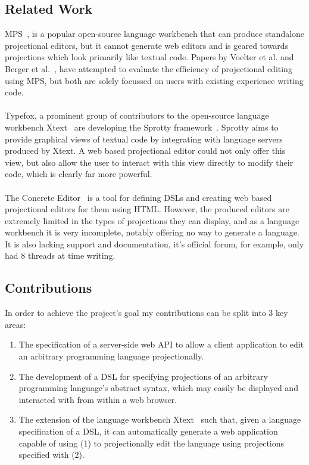 \documentclass{article}
\begin{document}
\subsection{Related Work}
MPS~\cite{mps},  is a popular open-source language workbench that can produce standalone projectional editors, but it cannot generate web editors and is geared towards projections which look primarily like textual code. Papers by Voelter et al. and Berger et al.~\cite{projEditControlledExperiment,towardsUserFriendlyProjEditors}, have attempted to evaluate the efficiency of projectional editing using MPS, but both are solely focussed on users with existing experience writing code.  
\\
\\
Typefox, a prominent group of contributors to the open-source language workbench Xtext~\cite{xtext} are developing the Sprotty framework~\cite{sprotty}. Sprotty aims to provide graphical views of textual code by integrating with language servers produced by Xtext. A web based projectional editor could not only offer this view, but also allow the user to interact with this view directly to modify their code, which is clearly far more powerful.
\\
\\
The Concrete Editor~\cite{concrete} is a tool for defining DSLs and creating web based projectional editors for them using HTML. However, the produced editors are extremely limited in the types of projections they can display, and as a language workbench it is very incomplete, notably offering no way to generate a language. It is also lacking support and documentation, it's official forum, for example, only had 8 threads at time writing.

\subsection{Contributions}

In order to achieve the project's goal my contributions can be split into 3 key areas:

\begin{enumerate}
\item The specification of a server-side web API to allow a client application to edit an arbitrary programming language projectionally.
\item The development of a DSL for specifying projections of an arbitrary programming language's abstract syntax, which may easily be displayed and interacted with from within a web browser.
\item The extension of the language workbench Xtext~\cite{xtext} such that, given a language specification of a DSL, it can automatically generate a web application capable of using (1) to projectionally edit the language using projections specified with (2).
\end{enumerate}
\end{document}
